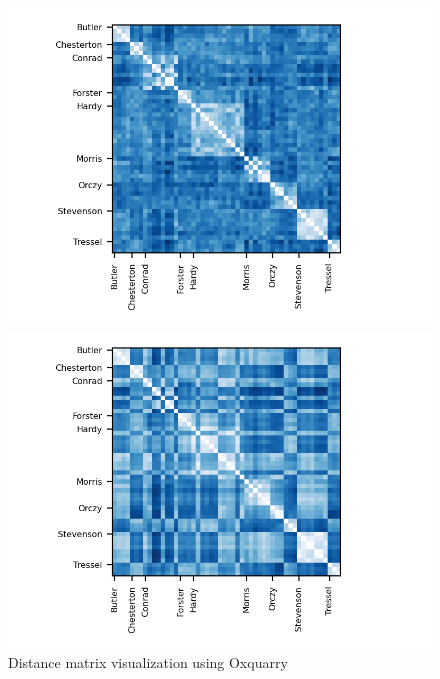 \begin{figure}
  \caption{Distance matrix visualization using Oxquarry}
  \label{fig:distances_matrix_oxquarry}

  \label{fig:distance_matrix_oxquarry_clark}
  \includegraphics{img/distance_matrix_oxquarry_clark.png}

  \vspace{0.5cm}

  \label{fig:distance_matrix_oxquarry_tanimoto}
  \includegraphics{img/distance_matrix_oxquarry_tanimoto.png}
\end{figure}

